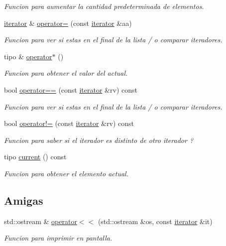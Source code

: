 \begin{DoxyCompactItemize}
\begin{DoxyCompactList}\small\item\em Funcion para aumentar la cantidad predeterminada de elementos. \end{DoxyCompactList}\item 
\hyperlink{classLista_1_1iterator}{iterator} \& \hyperlink{classLista_1_1iterator_a602f51e54500d6027158a48a8495826a}{operator=} (const \hyperlink{classLista_1_1iterator}{iterator} \&aa)
\begin{DoxyCompactList}\small\item\em Funcion para ver si estas en el final de la lista / o comparar iteradores. \end{DoxyCompactList}\item 
tipo \& \hyperlink{classLista_1_1iterator_a2a48c3991820aef39d777df2c8e19664}{operator$\ast$} ()
\begin{DoxyCompactList}\small\item\em Funcion para obtener el valor del actual. \end{DoxyCompactList}\item 
bool \hyperlink{classLista_1_1iterator_abb50011145596234ea6ac6d1bd5fe920}{operator==} (const \hyperlink{classLista_1_1iterator}{iterator} \&rv) const
\begin{DoxyCompactList}\small\item\em Funcion para ver si estas en el final de la lista / o comparar iteradores. \end{DoxyCompactList}\item 
bool \hyperlink{classLista_1_1iterator_a25cd74ab23dd46dd3e9f0769c0264eb9}{operator!=} (const \hyperlink{classLista_1_1iterator}{iterator} \&rv) const
\begin{DoxyCompactList}\small\item\em Funcion para saber si el iterador es distinto de otro iterador ? \end{DoxyCompactList}\item 
tipo \hyperlink{classLista_1_1iterator_a6e73de7c83716c9bd99bd68b89214d81}{current} () const
\begin{DoxyCompactList}\small\item\em Funcion para obtener el elemento actual. \end{DoxyCompactList}\end{DoxyCompactItemize}
\subsection*{Amigas}
\begin{DoxyCompactItemize}
\item 
std\+::ostream \& \hyperlink{classLista_1_1iterator_ab86d5cacfaca06c9075ddb7427cf7ddb}{operator$<$$<$} (std\+::ostream \&os, const \hyperlink{classLista_1_1iterator}{iterator} \&it)
\begin{DoxyCompactList}\small\item\em Funcion para imprimir en pantalla. \end{DoxyCompactList}\end{DoxyCompactItemize}
